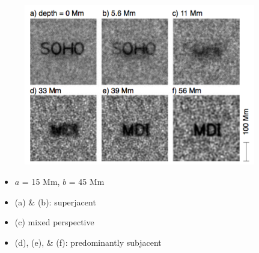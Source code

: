 \documentclass{beamer}
\begin{document}
\begin{frame}
    \begin{figure}
        \includegraphics[width=0.9\textwidth]{fig_3.png}
    \end{figure}
    \vspace{-0.25cm}
    \begin{itemize}
        \item $a$ = 15 Mm, $b$ = 45 Mm
        \item (a) \& (b): superjacent
        \item (c) mixed perspective
        \item (d), (e), \& (f): predominantly subjacent
    \end{itemize}
\end{frame}

\end{document}

